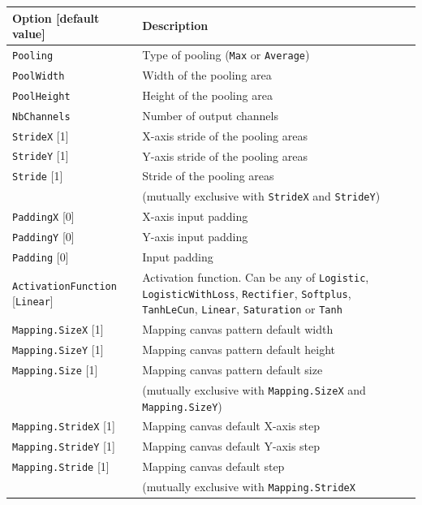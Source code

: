 \documentclass[a4paper,11pt,oneside]{article}
\begin{document}
\begin{center}
 \begin{longtable}{| p{5cm} | p{10cm} | }
 \hline
 Option [default value] & Description\\
 \hline\hline
  \cellcolor{requiredcolor}\lstinline!Pooling! & Type of pooling
  (\lstinline!Max! or \lstinline!Average!)\\
  \cellcolor{requiredcolor}\lstinline!PoolWidth! & Width of the pooling area \\
  \cellcolor{requiredcolor}\lstinline!PoolHeight! & Height of the pooling
area \\
  \cellcolor{requiredcolor}\lstinline!NbChannels! & Number of output channels \\
  \lstinline!StrideX! [1] & X-axis stride of the pooling areas \\
  \lstinline!StrideY! [1] & Y-axis stride of the pooling areas \\
  \lstinline!Stride! [1] & Stride of the pooling areas \\
   & (mutually exclusive with \lstinline!StrideX! and \lstinline!StrideY!) \\
  \lstinline!PaddingX! [0] & X-axis input padding \\
  \lstinline!PaddingY! [0] & Y-axis input padding \\
  \lstinline!Padding! [0] & Input padding \\
  \lstinline!ActivationFunction! [\lstinline!Linear!] & Activation function.
  Can be any of \lstinline!Logistic!,  \lstinline!LogisticWithLoss!,
  \lstinline!Rectifier!, \lstinline!Softplus!, \lstinline!TanhLeCun!,
  \lstinline!Linear!, \lstinline!Saturation! or \lstinline!Tanh! \\
  \lstinline!Mapping.SizeX! [1] & Mapping canvas pattern default width \\
  \lstinline!Mapping.SizeY! [1] & Mapping canvas pattern default height \\
  \lstinline!Mapping.Size! [1] & Mapping canvas pattern default size \\
   & (mutually exclusive with \lstinline!Mapping.SizeX!
   and \lstinline!Mapping.SizeY!) \\
  \lstinline!Mapping.StrideX! [1] & Mapping canvas default X-axis step \\
  \lstinline!Mapping.StrideY! [1] & Mapping canvas default Y-axis step \\
  \lstinline!Mapping.Stride! [1] & Mapping canvas default step \\
   & (mutually exclusive with \lstinline!Mapping.StrideX!

\end{longtable}
\end{center}
\end{document}

